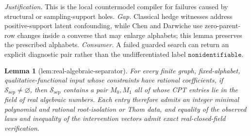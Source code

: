 \documentclass{article}
\newtheorem{lemma}{Lemma}
\begin{document}
\par\smallskip\noindent \textit{Justification.} This is the local countermodel compiler for failures caused by structural or sampling-support holes. \textit{Gap.} Classical hedge witnesses address positive-support latent confounding, while Chen and Darwiche use zero-parent-row changes inside a converse that may enlarge alphabets; this lemma preserves the prescribed alphabets. \textit{Consumer.} A failed guarded search can return an explicit diagnostic pair rather than the undifferentiated label \(\texttt{nonidentifiable}\).

\begin{lemma}[lem:real-algebraic-separator]\label{lem:real-algebraic-separator}
For every finite graph, fixed-alphabet, qualitative-functional input whose constraints have rational coefficients, if \(\mathcal S_{\mathrm{sep}}\ne\varnothing\), then \(\mathcal S_{\mathrm{sep}}\) contains a pair \(M_0,M_1\) all of whose CPT entries lie in the field of real algebraic numbers. Each entry therefore admits an integer minimal polynomial and rational root-isolation or Thom data, and equality of the observed laws and inequality of the intervention vectors admit exact real-closed-field verification.
\end{lemma}
\end{document}
